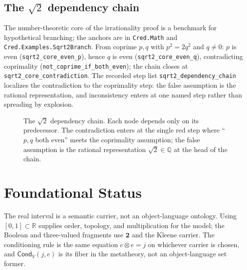 \documentclass[11pt,a4paper]{article}
\newcommand{\Cond}{\mathsf{Cond}}
\newcommand{\conjc}{\otimes}
\newcommand{\Real}{\mathbb{R}}
\newcommand{\Lean}[1]{\texttt{#1}}
\begin{document}
\subsection{The $\sqrt2$ dependency chain}
The number-theoretic core of the irrationality proof is a benchmark for
hypothetical branching; the anchors are in \texttt{Cred.Math} and
\texttt{Cred.Examples.Sqrt2Branch}.  From coprime $p,q$ with $p^2=2q^2$
and $q\neq0$: $p$ is even (\Lean{sqrt2\_core\_even\_p}), hence $q$ is
even (\Lean{sqrt2\_core\_even\_q}), contradicting coprimality
(\Lean{not\_coprime\_if\_both\_even}); the chain closes at
\Lean{sqrt2\_core\_contradiction}.  The recorded step list
\Lean{sqrt2\_dependency\_chain} localizes the contradiction to the
coprimality step: the false assumption is the rational representation,
and inconsistency enters at one named step rather than spreading by
explosion.

\begin{figure}[h]
\centering
{}
\caption{The $\sqrt2$ dependency chain.  Each node depends only on its
predecessor.  The contradiction enters at the single red step where
``$p,q$ both even'' meets the coprimality assumption; the false
assumption is the rational representation $\sqrt2\in\mathbb{Q}$ at the
head of the chain.}
\label{fig:sqrt2-chain}
\end{figure}

\section{Foundational Status}

The real interval is a semantic carrier, not an object-language
ontology.  Using $[0,1]\subset\Real$ supplies order, topology, and
multiplication for the model; the Boolean and three-valued fragments use
$\mathbf 2$ and the Kleene carrier.  The conditioning rule is the same
equation $c\conjc e=j$ on whichever carrier is chosen, and
$\Cond_V(j,e)$ is its fiber in the metatheory, not an object-language
set former.
\end{document}
